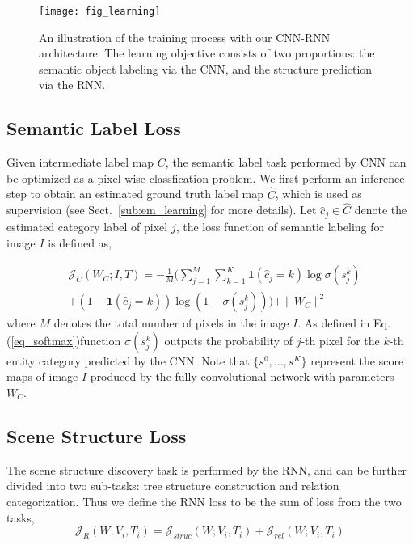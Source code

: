 \documentclass[10pt,twocolumn,letterpaper]{article}
\begin{document}
\begin{figure}[t]
\centering
\texttt{[image: fig\_learning]}
\caption{An illustration of the training process with our CNN-RNN architecture. The learning objective consists of two proportions: the semantic object labeling via the CNN, and the structure prediction via the RNN.}
\label{fig:learning}
\end{figure}

\subsection{Semantic Label Loss} \label{sub:cnn_loss}
Given intermediate label map $C$, the semantic label task performed by CNN can be optimized as a pixel-wise classfication problem. We first perform an inference step to obtain an estimated ground truth label map $\widehat{C}$, which is used as supervision (see Sect.~\ref{sub:em_learning} for more details). Let $\widehat{c}_j \in \widehat{C}$ denote the estimated category label of pixel $j$, the loss function of semantic labeling for image $I$ is defined as,


\iffalse

\fi


\begin{equation}\label{eq_cnn_loss}
\begin{split}
&\mathcal{J}_{C}(W_C;I,T) = -\frac{1}{M}( \sum_{j=1}^M \sum_{k=1}^K \textbf{1}(\widehat{c}_j=k)\log \sigma(s_j^k)\\
& +(1-\textbf{1}(\widehat{c}_j=k))\log(1-\sigma(s_j^k)) ) + \|W_C\|^2
\end{split}
\end{equation}
where $M$ denotes the total number of pixels in the image $I$. As defined in Eq.(\ref{eq_softmax})function $\sigma(s_j^k)$ outputs the probability of $j$-th pixel for the $k$-th entity category predicted by the CNN. Note that $\{s^0,...,s^K\}$ represent the score maps of image $I$ produced by the fully convolutional network with parameters $W_C$.


\subsection{Scene Structure Loss} \label{sub:rnn_loss}
The scene structure discovery task is performed by the RNN, and can be further divided into two sub-tasks: tree structure construction and relation categorization. Thus we define the RNN loss to be the sum of loss from the two tasks,
\begin{equation}\label{eq_rnn_loss}
	\mathcal{J}_{R}(W;V_i,T_i) = \mathcal{J}_{struc}(W;V_i,T_i) + \mathcal{J}_{rel}(W;V_i,T_i)
\end{equation}
\end{document}
